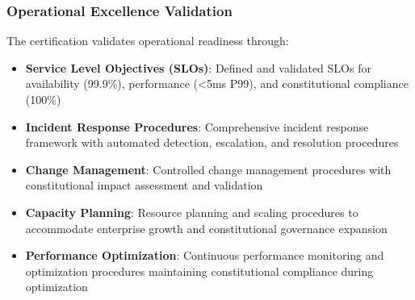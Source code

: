 \subsubsection{Operational Excellence Validation}
The certification validates operational readiness through:
\begin{itemize}[leftmargin=*,itemsep=1pt,parsep=1pt]
    \item \textbf{Service Level Objectives (SLOs)}: Defined and validated SLOs for availability (99.9\%), performance (<5ms P99), and constitutional compliance (100\%)
    \item \textbf{Incident Response Procedures}: Comprehensive incident response framework with automated detection, escalation, and resolution procedures
    \item \textbf{Change Management}: Controlled change management procedures with constitutional impact assessment and validation
    \item \textbf{Capacity Planning}: Resource planning and scaling procedures to accommodate enterprise growth and constitutional governance expansion
    \item \textbf{Performance Optimization}: Continuous performance monitoring and optimization procedures maintaining constitutional compliance during optimization
\end{itemize}

